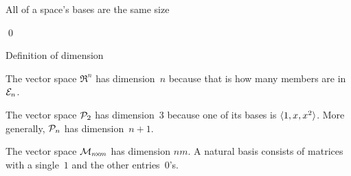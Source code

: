 \documentclass[10pt,t,serif,professionalfont]{beamer}
\begin{document}
\begin{frame}{All of a space's bases are the same size}
\th[th:AllBasesSameSize]

\pause
\pf
{}

\pause
{}
\end{frame}
\begin{frame}

\pause
{}
\qed
\end{frame}



\begin{frame}{Definition of dimension}
\df[df:Dimension]

\pause\medskip
\ex
The vector space $\Re^n$ has dimension~$n$ because that is how many members
are in ${\cal E}_n$.

\pause
\ex
The vector space $\mathcal{P}_2$ has dimension~$3$ because one of 
its bases is $\langle1,x,x^2\rangle$.
\pause
More generally, $\mathcal{P}_n$ has dimension~$n+1$.

\pause
\ex
The vector space $\mathcal{M}_{n \! \times \! m}$ has dimension $nm$.
A natural basis consists of matrices with a single~$1$ and the other
entries~$0$'s.
\end{frame}
\end{document}
